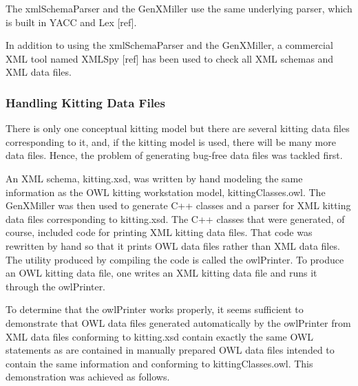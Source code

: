 The xmlSchemaParser and the GenXMiller use the same underlying parser,
which is built in YACC and Lex [ref].

In addition to using the xmlSchemaParser and the GenXMiller, a commercial
XML tool named XMLSpy [ref] has been used to check all XML schemas and XML
data files.\\

\subsubsection{Handling Kitting Data Files}

There is only one conceptual kitting model but there are several kitting
data files corresponding to it, and, if the kitting model is used, there
will be many more data files. Hence, the problem of generating bug-free
data files was tackled first.

An XML schema, kitting.xsd, was written by hand modeling the same
information as the OWL kitting workstation model, kittingClasses.owl. The
GenXMiller was then used to generate C++ classes and a parser for XML
kitting data files corresponding to kitting.xsd. The C++ classes that were
generated, of course, included code for printing XML kitting data
files. That code was rewritten by hand so that it prints OWL data files
rather than XML data files. The utility produced by compiling the code is
called the owlPrinter. To produce an OWL kitting data file, one writes an
XML kitting data file and runs it through the owlPrinter.

To determine that the owlPrinter works properly, it seems sufficient to
demonstrate that OWL data files generated automatically by the owlPrinter
from XML data files conforming to kitting.xsd contain exactly the same OWL
statements as are contained in manually prepared OWL data files intended to
contain the same information and conforming to kittingClasses.owl. This
demonstration was achieved as follows.

